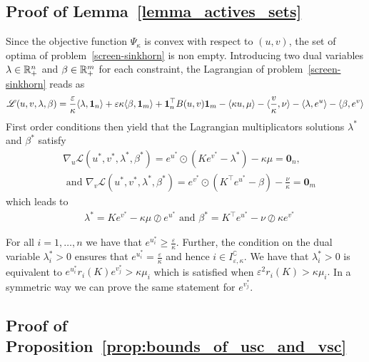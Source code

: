 
\subsection{Proof of Lemma~\ref{lemma_actives_sets}}

Since the objective function $\Psi_{\kappa}$ is convex with respect to $(u,v)$, the set of optima of problem~\eqref{screen-sinkhorn} is non empty.
Introducing two dual variables $\lambda \in {\mathbb{R}}^n_{+}$ and $\beta \in {\mathbb{R}}^m_{+}$ for each constraint, the Lagrangian of problem~\eqref{screen-sinkhorn} reads as 
\begin{equation*}
  \mathscr{L}(u,v, \lambda, \beta) = \frac \varepsilon\kappa\langle \lambda, \mathbf{1}_n \rangle + \varepsilon\kappa\langle \beta, \mathbf{1}_m \rangle + \mathbf{1}_n^\top B(u,v) \mathbf{1}_m - \langle \kappa u, \mu \rangle - \langle \frac v\kappa, \nu \rangle -\langle \lambda,e^{u} \rangle - \langle \beta,e^{v} \rangle
\end{equation*}
First order conditions then yield that the Lagrangian multiplicators solutions $\lambda^{*}$ and $\beta^{*}$ satisfy 
\begin{align*}
  &\nabla_u\mathscr{L}(u^{*},v^{*}, \lambda^{*}, \beta^{*})=  e^{u^{*}} \odot(Ke^{v^{*}} - \lambda^{*}) - \kappa\mu = \mathbf 0_n,\\
  & \text{ and } \nabla_v\mathscr{L}(u^{*},v^{*}, \lambda^{*}, \beta^{*})=  e^{v^{*}} \odot(K^\top e^{u^{*}} - \beta) - \frac \nu\kappa = \mathbf 0_m
\end{align*}
which leads to 
\begin{align*}
  &\lambda^{*} = K e^{v^{*}} - \kappa\mu \oslash e^{u^{*}} \text{ and }
  \beta^{*} = K^\top e^{u^{*}} - \nu \oslash \kappa e^{v^{*}}
\end{align*}

For all $i=1, \ldots, n$ we have that $e^{u^{*}_i} \geq \frac\varepsilon\kappa$. Further, the condition on the dual variable $\lambda^{*}_i > 0$  ensures that $e^{u^{*}_i} = \frac\varepsilon\kappa$ and hence $i \in I^\complement_{\varepsilon,\kappa}$. We have that $\lambda^{*}_i > 0$ is equivalent to $e^{u^{*}_i}r_i(K) e^{v^{*}_j} >  \kappa{\mu_i}$ which  is satisfied when $\varepsilon^2r_i(K) >  \kappa{\mu_i}.$  
In a symmetric way we can prove the same statement for $e^{v^{*}_j}$.

\subsection{Proof of Proposition~\ref{prop:bounds_of_usc_and_vsc}}

